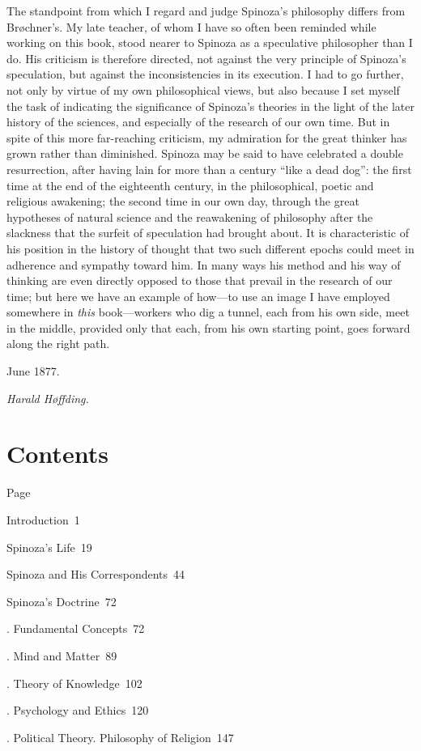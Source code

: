\documentclass[12pt]{book}
\newcommand{\tocline}[3]{\noindent\makebox[2.2em][r]{#1}\hspace{0.6em}#2\dotfill\ #3\par}
\newcommand{\opage}[1]{\marginnote{\footnotesize\textit{[#1]}}}
\begin{document}
The standpoint from which I regard and judge Spinoza's philosophy differs from
Brøchner's. My late teacher, of whom I have so often been reminded while working
on this book, stood nearer to Spinoza as a speculative philosopher than I do. His
criticism is therefore directed, not against the very principle of Spinoza's
speculation, but against the inconsistencies in its execution. I had to go
further, not only by virtue of my own philosophical views, but also because I set
myself the task of indicating the significance of Spinoza's theories in the light
of the later history of the sciences, and especially of the research of our own
time. But in spite of this more far-reaching criticism, my admiration for the great
thinker has grown rather than diminished. Spinoza may be said to have celebrated a
double resurrection, after having lain for more than a century ``like a dead
dog'': the first time at the end of the eighteenth century, in the philosophical,
\opage{V}poetic and religious awakening; the second time in our own day, through the
great hypotheses of natural science and the reawakening of philosophy after the
slackness that the surfeit of speculation had brought about. It is characteristic
of his position in the history of thought that two such different epochs could
meet in adherence and sympathy toward him. In many ways his method and his way of
thinking are even directly opposed to those that prevail in the research of our
time; but here we have an example of how---to use an image I have employed
somewhere in \emph{this} book---workers who dig a tunnel, each from his own side,
meet in the middle, provided only that each, from his own starting point, goes
forward along the right path.

\medskip
\noindent\hspace*{3em}June 1877.\par
\hfill\emph{Harald Høffding.}\par

\chapter*{Contents}
\hfill Page\par
\tocline{}{Introduction}{1}
\tocline{}{Spinoza's Life}{19}
\tocline{}{Spinoza and His Correspondents}{44}
\tocline{}{Spinoza's Doctrine}{72}
\tocline{}{. Fundamental Concepts}{72}
\tocline{}{. Mind and Matter}{89}
\tocline{}{. Theory of Knowledge}{102}
\tocline{}{. Psychology and Ethics}{120}
\tocline{}{. Political Theory. Philosophy of Religion}{147}
\end{document}
